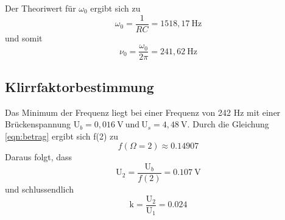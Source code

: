 \noindent Der Theoriwert für $\omega_0$ ergibt sich zu
\begin{equation*}
  \omega_0 = \frac{1}{RC} = 1518,17 \: \si{\hertz}
\end{equation*}
\noindent und somit
\begin{equation*}
  \nu_0 = \frac{\omega_0}{2\pi} = 241,62 \: \si{\hertz}
\end{equation*}

\subsection{Klirrfaktorbestimmung}

Das Minimum der Frequenz liegt bei einer Frequenz von 242 $\si{\hertz}$
mit einer Brückenspannung $\text{U}_b = 0,016 \: \si{\volt} \: \text{und} \:
\text{U}_s = 4,48 \: \si{\volt} $.
Durch die Gleichung \ref{eqn:betrag}
ergibt sich f(2) zu
\begin{equation*}
  f(\Omega =2) \approx 0.14907
\end{equation*}
\noindent Daraus folgt, dass
\begin{equation*}
  \text{U}_2 = \frac{\text{U}_b}{f(2)} = \SI{0.107}{\volt}
\end{equation*}
\noindent und schlussendlich
\begin{equation*}
  \text{k}= \frac{\text{U}_2}{\text{U}_1} = 0.024
\end{equation*}
